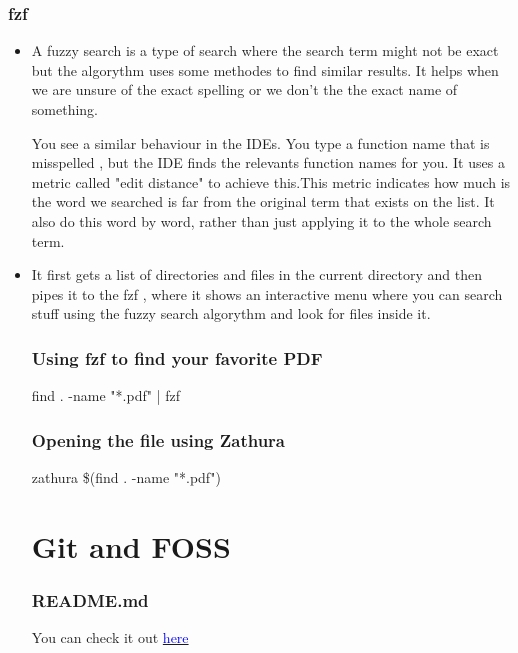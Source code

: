 \documentclass[titlepage]{article}
\begin{document}
\subsubsection{fzf}
\begin{itemize}
\item A fuzzy search is a type of search where the search term might not be exact but the algorythm uses some methodes to find similar results.
  It helps when we are unsure of the exact spelling or we don't the the exact name of something.

    You see a similar behaviour in the IDEs. You type a function name that is misspelled , but the IDE finds the relevants function names for you.
  It uses a metric called "edit distance" to achieve this.This metric indicates how much is the word we searched is far from the original term that exists on the list.
    It also do this word by word, rather than just applying it to the whole search term.
\item It first gets a list of directories and files in the current directory and then pipes it to the fzf , where it shows an interactive menu where you can search stuff using the fuzzy search algorythm and look for files inside it.
\subsubsection{Using fzf to find your favorite PDF}
    find . -name "*.pdf" | fzf
\subsubsection{Opening the file using Zathura}
    zathura \$(find . -name "*.pdf")
\section{Git and FOSS}
\subsubsection{README.md}
    You can check it out \href{https://github.com/Sdrf1445/CW1402FINAL}{\textcolor{blue}{here}}  

   
\end{itemize}






  
\end{document}
